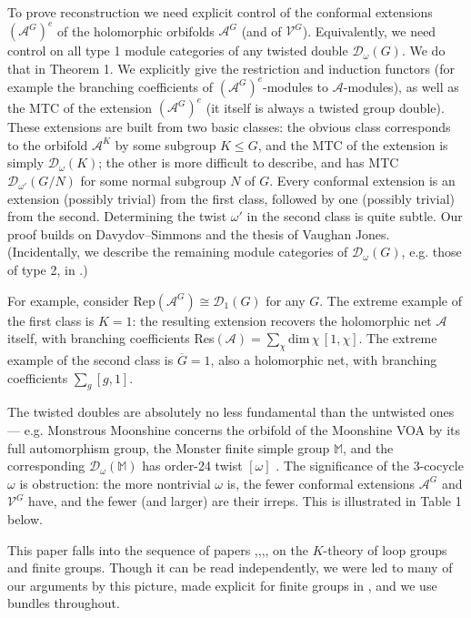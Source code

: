 \documentclass[12pt]{article}
\numberwithin{equation}{section}
\def\cA            {{\mathcal{A}}}
\def\cD            {{\mathcal{D}}}
\def\cV            {{\mathcal{V}}}
\def\bbM           {\mathbb{M}}
\begin{document}
To prove reconstruction we need explicit control of the conformal extensions $(\cA^G)^e$ of the holomorphic orbifolds $\cA^G$ (and of $\cV^G$). Equivalently, we need control on all type 1 module categories of any twisted double $\cD_\omega(G)$. We do that in Theorem 1. We explicitly give the restriction and
induction functors (for example the branching coefficients of $(\cA^G)^e$-modules to $\cA$-modules), as well as the MTC of the extension $(\cA^G)^e$ (it itself is always  a twisted  group double).  These extensions are built from  two basic classes: the obvious class corresponds to the orbifold $\cA^K$ by some subgroup $K\le G$, and the MTC of the extension is simply $\cD_\omega(K)$; the other  is more difficult to describe, and has MTC $\cD_{\omega'}(G/N)$ for some normal subgroup $N$ of $G$. Every conformal extension is an extension (possibly trivial) from the first class, followed by one (possibly trivial) from the second.  Determining the twist $\omega'$ in the second class is quite subtle. Our proof builds on Davydov--Simmons \cite{Dav3} and  the thesis \cite{Jon2} of Vaughan Jones. (Incidentally, we describe the remaining module categories of $\cD_\omega(G)$, e.g. those of type 2, in \cite{EG8}.) 

For example, consider Rep$(\cA^G)\cong\cD_1(G)$ for any $G$. The extreme example of the first class
is $K=1$: the resulting extension recovers the holomorphic net $\cA$ itself, with branching coefficients
Res$(\cA)=\sum_\chi\mathrm{dim}\,\chi\,[1,\chi]$.  The extreme example of the second class is $\overline{G}=1$, also
a holomorphic net, with branching coefficients $\sum_g[g,1]$.



The twisted doubles are absolutely no less fundamental than the untwisted ones --- e.g.  Monstrous Moonshine concerns the orbifold of the Moonshine VOA by its full automorphism group, the Monster finite simple group $\bbM$, and the corresponding $\cD_\omega(\bbM)$ has order-24 twist $[\omega]$ \cite{JF}. The significance of the 3-cocycle $\omega$ is obstruction: the more nontrivial  $\omega$ is, the fewer conformal extensions $\cA^G$  and
$\cV^G$ have, and the fewer (and larger) are their irreps. This is illustrated in Table 1 below.


This paper falls into the sequence of  papers \cite{EG1},\cite{EG3},\cite{Ev},\cite{EG7},\cite{EG8} on the $K$-theory of loop groups and finite groups. Though it can be read independently, we were led to many of our arguments by this picture,  made explicit for finite groups in \cite{Ev}, and we use bundles throughout.
\end{document}
